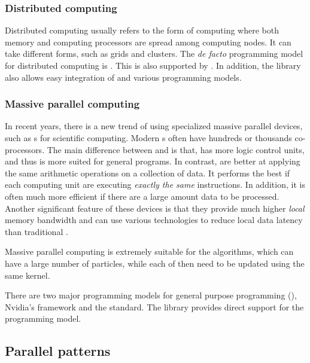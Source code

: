 \subsubsection{Distributed computing}
\label{ssub:Distributed computing}

Distributed computing usually refers to the form of computing where both
memory and computing processors are spread among computing nodes. It can take
different forms, such as grids and clusters. The \emph{de facto} programming
model for distributed computing is \mpi. This is also supported by \vsmc. In
addition, the library also allows easy integration of \mpi and various \smp
programming models.

\subsubsection{Massive parallel computing}
\label{ssub:Massive parallel computing}

In recent years, there is a new trend of using specialized massive parallel
devices, such as \gpu{}s for scientific computing. Modern \gpu{}s often have
hundreds or thousands co-processors. The main difference between \gpu and \cpu
is that, \cpu has more logic control units, and thus is more suited for
general programs. In contrast, \gpu are better at applying the same arithmetic
operations on a collection of data. It performs the best if each computing
unit are executing \emph{exactly the same} instructions. In addition, it is
often much more efficient if there are a large amount data to be processed.
Another significant feature of these devices is that they provide much higher
\emph{local} memory bandwidth and can use various technologies to reduce local
data latency than traditional \cpu.

Massive parallel computing is extremely suitable for the \smc algorithms,
which can have a large number of particles, while each of then need to be
updated using the same \mcmc kernel.

There are two major programming models for general purpose \gpu programming
(\gpgpu), Nvidia's \cuda framework and the \opencl \cite{opencl} standard. The
\vsmc library provides direct support for the \opencl programming model.

\subsection{Parallel patterns}
\label{sub:Parallel patterns}

